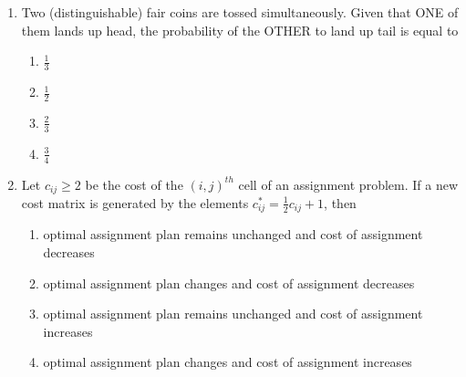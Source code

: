 \documentclass[journal]{IEEEtran}
\begin{document}
\begin{enumerate}
{where $U_i = \frac{X_i - 80}{3}, i=1,2,\ldots,10$. Then the value of $E(ST)$ is equal to
\begin{multicols}{4}
    \begin{enumerate}
        \item $0$
        \item $1$
        \item $10$
        \item $\frac{80}{3}$
    \end{enumerate}
\end{multicols}
}

\item{ Two (distinguishable) fair coins are tossed simultaneously. Given that ONE of them lands up head, the probability of the OTHER to land up tail is equal to
\begin{multicols}{4}
    \begin{enumerate}
        \item $\frac{1}{3}$
        \item $\frac{1}{2}$
        \item $\frac{2}{3}$
        \item $\frac{3}{4}$
    \end{enumerate}
\end{multicols}
}

\item{ Let $c_{ij}\geq2$ be the cost of the $(i, j)^{th}$ cell of an assignment problem. If a new cost matrix is generated by the elements $c_{ij}^*= \frac{1}{2} c_{ij} +1$, then

\begin{enumerate}
    \item optimal assignment plan remains unchanged and cost of assignment decreases 
    \item optimal assignment plan changes and cost of assignment decreases
    \item optimal assignment plan remains unchanged and cost of assignment increases 
    \item optimal assignment plan changes and cost of assignment increases
\end{enumerate}
}





\end{enumerate}
\end{document}
